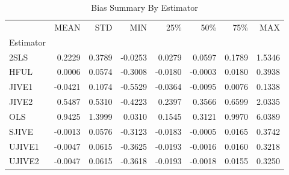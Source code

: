 \begin{table}[ht]
\centering
\caption{Bias Summary By Estimator}
\begin{tabular}{lrrrrrrr}
\toprule
 & MEAN & STD & MIN & 25\% & 50\% & 75\% & MAX \\
Estimator &  &  &  &  &  &  &  \\
\midrule
2SLS & 0.2229 & 0.3789 & -0.0253 & 0.0279 & 0.0597 & 0.1789 & 1.5346 \\
HFUL & 0.0006 & 0.0574 & -0.3008 & -0.0180 & -0.0003 & 0.0180 & 0.3938 \\
JIVE1 & -0.0421 & 0.1074 & -0.5529 & -0.0364 & -0.0095 & 0.0076 & 0.1338 \\
JIVE2 & 0.5487 & 0.5310 & -0.4223 & 0.2397 & 0.3566 & 0.6599 & 2.0335 \\
OLS & 0.9425 & 1.3999 & 0.0310 & 0.1545 & 0.3121 & 0.9970 & 6.0389 \\
SJIVE & -0.0013 & 0.0576 & -0.3123 & -0.0183 & -0.0005 & 0.0165 & 0.3742 \\
UJIVE1 & -0.0047 & 0.0615 & -0.3625 & -0.0193 & -0.0016 & 0.0160 & 0.3218 \\
UJIVE2 & -0.0047 & 0.0615 & -0.3618 & -0.0193 & -0.0018 & 0.0155 & 0.3250 \\
\bottomrule
\end{tabular}
\end{table}
